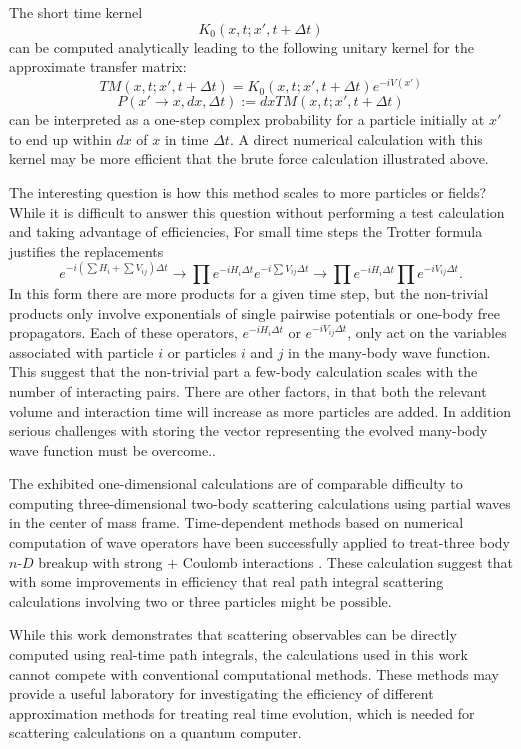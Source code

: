 \documentclass[aps,prc,reprint,noshowpacs,groupedaddress,onecolumn]{revtex4}
\begin{document}
The short time kernel
\[
K_0(x,t;x',t+\Delta t) 
\]
can be computed analytically leading to the following
unitary kernel for the approximate transfer matrix:
\[ 
TM(x,t;x',t+\Delta t) = 
K_0(x,t;x',t+\Delta t)e^{-i V(x')}
\]
\[
P(x'\to x, dx, \Delta t) := dx TM(x,t;x',t+\Delta t) 
\]
can be interpreted as a one-step complex probability
for a particle initially at $x'$ to end up within
$dx$ of $x$ in time $\Delta t$.  A direct numerical calculation
with this kernel may be more efficient that the brute force
calculation illustrated above.

The interesting question is how this method scales to more
particles or fields?  While
it is difficult to answer this question
without performing a test calculation and taking advantage of efficiencies,
For small time steps the Trotter formula justifies the replacements
\[
e^{-i (\sum H_i + \sum V_{ij})\Delta t} \to
\prod e^{-i H_i \Delta t} e^{-i \sum V_{ij} \Delta t} \to
\prod e^{-i H_i \Delta t} \prod e^{-iV_{ij} \Delta t} .
\]
In this form there are more products for a given time step, but the
non-trivial products only involve exponentials of single pairwise
potentials or one-body free propagators. Each of these operators,
$e^{-i H_i \Delta t}$ or $e^{-iV_{ij} \Delta t}$, only
act on the variables associated with particle $i$ or particles $i$ and $j$ in
the many-body wave function.  This suggest that the non-trivial part a
few-body calculation scales with the number of interacting pairs.
There are other factors, in that both the relevant volume and
interaction time will increase as more particles are added.  In
addition serious challenges with storing the vector
representing the evolved many-body wave function must be overcome..

The exhibited one-dimensional calculations are of comparable
difficulty to computing three-dimensional two-body scattering
calculations using partial waves in the center of mass frame.
Time-dependent methods based on numerical computation of wave
operators have been successfully applied to treat-three body $n$-$D$
breakup with strong $+$ Coulomb interactions \cite{kroger}.  These
calculation suggest that with some improvements in efficiency that
real path integral scattering calculations involving two or three
particles might be possible.

While this work demonstrates that scattering observables can be
directly computed using real-time path integrals, the calculations
used in this work cannot compete with conventional computational
methods.  These methods may provide a useful laboratory
for investigating the efficiency of different approximation
methods for treating real time evolution, which is needed
for scattering calculations on a quantum computer.
\end{document}
